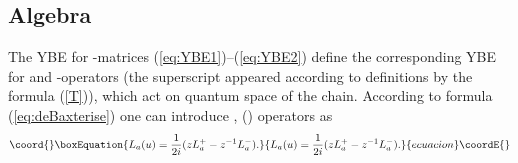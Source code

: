 \documentclass[a4paper,a4paper]{article}
\begin{document}
\subsection{Algebra}

The YBE for \coordHE{}-matrices (\ref{eq:YBE1})--(\ref{eq:YBE2}) 
define the corresponding
YBE for \coordHE{} and \coordHE{}-operators (the superscript
\myHighlight{$\iota$}\coordHE{} appeared according to definitions by the formula (\ref{T})), 
which act on quantum space of the chain.
According to formula (\ref{eq:deBaxterise}) one can introduce 
\coordHE{},  (\coordHE{}) operators as
\begin{equation}\coord{}\boxEquation{
  \label{L}
  L_a(u)={1 \over 2i}(z L_a^+ - z^{-1} L_a^{-}).
}{
  L_a(u)={1 \over 2i}(z L_a^+ - z^{-1} L_a^{-}).
}{ecuacion}\coordE{}\end{equation}
\medskip
\end{document}
